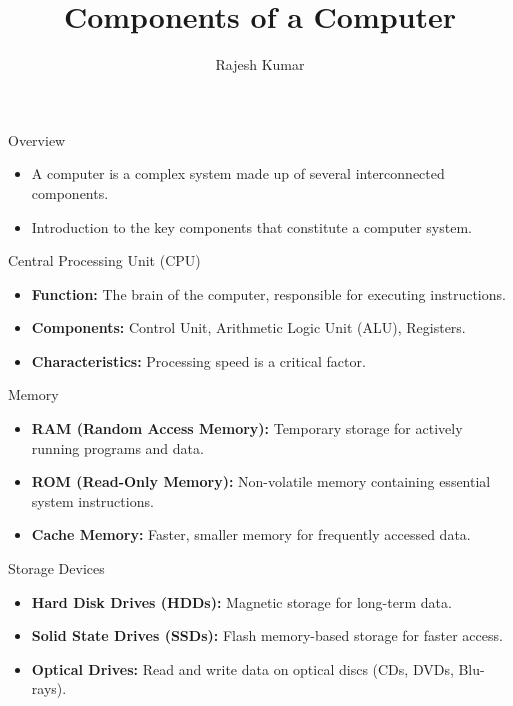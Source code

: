 \title{Components of a Computer}
\author{Rajesh Kumar}
\date{}


\begin{frame}
  \titlepage
\end{frame}

\begin{frame}{Overview}
  \begin{itemize}
    \item A computer is a complex system made up of several interconnected components.
    \item Introduction to the key components that constitute a computer system.
  \end{itemize}
\end{frame}

\begin{frame}{Central Processing Unit (CPU)}
  \begin{itemize}
    \item \textbf{Function:} The brain of the computer, responsible for executing instructions.
    \item \textbf{Components:} Control Unit, Arithmetic Logic Unit (ALU), Registers.
    \item \textbf{Characteristics:} Processing speed is a critical factor.
  \end{itemize}
\end{frame}

\begin{frame}{Memory}
  \begin{itemize}
    \item \textbf{RAM (Random Access Memory):} Temporary storage for actively running programs and data.
    \item \textbf{ROM (Read-Only Memory):} Non-volatile memory containing essential system instructions.
    \item \textbf{Cache Memory:} Faster, smaller memory for frequently accessed data.
  \end{itemize}
\end{frame}

\begin{frame}{Storage Devices}
  \begin{itemize}
    \item \textbf{Hard Disk Drives (HDDs):} Magnetic storage for long-term data.
    \item \textbf{Solid State Drives (SSDs):} Flash memory-based storage for faster access.
    \item \textbf{Optical Drives:} Read and write data on optical discs (CDs, DVDs, Blu-rays).
  \end{itemize}
\end{frame}

